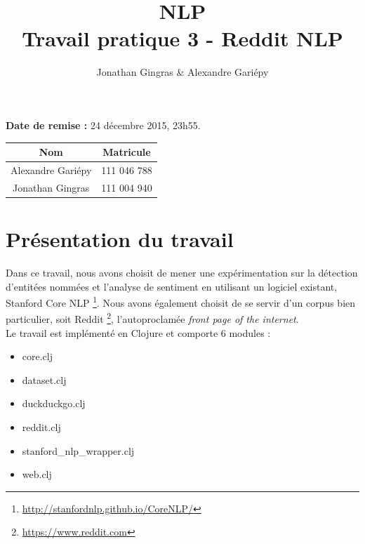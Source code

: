 \documentclass[12pt]{article}
\begin{document}
\title{NLP \\ Travail pratique 3 - Reddit NLP}
\author{Jonathan Gingras \& Alexandre Gariépy}
\maketitle

\begin{center}
  \textbf{Date de remise :} 24 décembre 2015, 23h55.
\end{center}
\begin{center}
\end{center}
\begin{center}
  \begin{tabular}{|c|c|}              \hline
    Nom               & Matricule   \\\hline
    Alexandre Gariépy & 111 046 788 \\\hline
    Jonathan Gingras  & 111 004 940 \\\hline
  \end{tabular}
\end{center}

\clearpage


\section{Présentation du travail}
Dans ce travail, nous avons choisit de mener une expérimentation sur la détection d'entitées nommées et l'analyse de sentiment en utilisant un logiciel existant, Stanford Core NLP \footnote{\url{http://stanfordnlp.github.io/CoreNLP/}}. Nous avons également choisit de se servir d'un corpus bien particulier, soit Reddit \footnote{\url{https://www.reddit.com}}, l'autoproclamée \textit{front page of the internet}.\\

Le travail est implémenté en Clojure et comporte 6 modules :
\begin{itemize}
\item core.clj
\item dataset.clj
\item duckduckgo.clj
\item reddit.clj
\item stanford\_nlp\_wrapper.clj
\item web.clj
\end{itemize}
\end{document}
